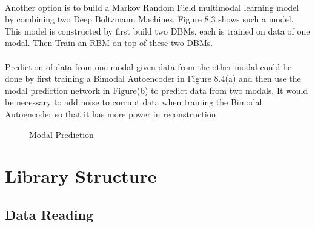 \documentclass[12pt]{article}
\begin{document}
\\
Another option is to build a Markov Random Field multimodal learning model by combining two Deep Boltzmann Machines. Figure 8.3 shows such a model. This model is constructed by first build two DBMs, each is trained on data of one modal. Then Train an RBM on top of these two DBMs.\\
\\
Prediction of data from one modal given data from the other modal could be done by first training a Bimodal Autoencoder in Figure 8.4(a) and then use the modal prediction network in Figure(b) to predict data from two modals. It would be necessary to add noise to corrupt data when training the Bimodal Autoencoder so that it has more power in reconstruction.
 \begin{figure}[!t]
\centering
{}
\caption{Modal Prediction}
\label{fig5}
\end{figure}
\clearpage
\section{Library Structure}
\subsection{Data Reading}
\end{document}
